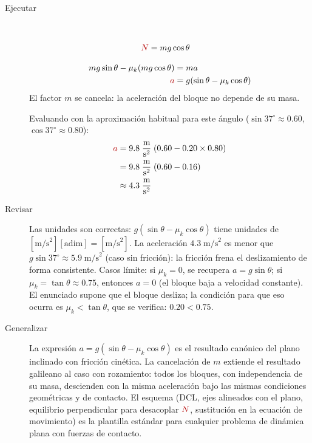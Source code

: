 \documentclass[11pt]{book}
\newcommand{\incog}[1]{\textcolor{colIncog}{#1}}
\begin{document}
\begin{enumerate}
\begin{description}
\item[Ejecutar]~

\begin{align}
\incog{N} &= mg\cos\theta \nonumber
\end{align}

\begin{align}
mg\sin\theta - \mu_k(mg\cos\theta) &= ma \nonumber\\
\incog{a} &= g(\sin\theta - \mu_k\cos\theta) \nonumber
\end{align}
El factor $m$ se cancela: la aceleración del bloque no depende de su masa.

Evaluando con la aproximación habitual para este ángulo ($\sin 37^\circ \approx 0.60$, $\cos 37^\circ \approx 0.80$):
\begin{align}
\incog{a} &= 9.8\;\frac{\text{m}}{\text{s}^2}\;(0.60 - 0.20\times 0.80) \nonumber\\
          &= 9.8\;\frac{\text{m}}{\text{s}^2}\;(0.60 - 0.16) \nonumber\\
          &\approx 4.3\;\frac{\text{m}}{\text{s}^2} \nonumber
\end{align}

\item[Revisar] Las unidades son correctas: $g(\sin\theta - \mu_k\cos\theta)$ tiene unidades de $[\text{m/s}^2][\text{adim}] = [\text{m/s}^2]$. La aceleración $4.3\;\text{m/s}^2$ es menor que $g\sin 37^\circ \approx 5.9\;\text{m/s}^2$ (caso sin fricción): la fricción frena el deslizamiento de forma consistente. Casos límite: si $\mu_k = 0$, se recupera $a = g\sin\theta$; si $\mu_k = \tan\theta \approx 0.75$, entonces $a = 0$ (el bloque baja a velocidad constante). El enunciado supone que el bloque desliza; la condición para que eso ocurra es $\mu_k < \tan\theta$, que se verifica: $0.20 < 0.75$.

\item[Generalizar] La expresión $a = g(\sin\theta - \mu_k\cos\theta)$ es el resultado canónico del plano inclinado con fricción cinética. La cancelación de $m$ extiende el resultado galileano al caso con rozamiento: todos los bloques, con independencia de su masa, descienden con la misma aceleración bajo las mismas condiciones geométricas y de contacto. El esquema (DCL, ejes alineados con el plano, equilibrio perpendicular para desacoplar $\incog{N}$, sustitución en la ecuación de movimiento) es la plantilla estándar para cualquier problema de dinámica plana con fuerzas de contacto.


\end{description}
\end{enumerate}
\end{document}
